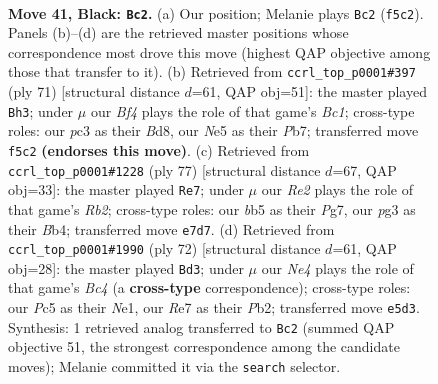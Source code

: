 \documentclass[11pt]{article}
\begin{document}
\clearpage

\begin{figure}[p]\centering
\begin{subfigure}{0.46\textwidth}\centering
\resizebox{\linewidth}{!}{%
\newchessgame
\chessboard[
  setfen={1r6/4r1k1/1p6/pBp1nb2/P5p1/1NP3P1/K6P/4R1NR b - - 4 41},
  showmover=false,
  pgfstyle=straightmove, color=movearrow, markmove={f5-c2}
]}
\caption{}
\end{subfigure}\hfill
\begin{subfigure}{0.46\textwidth}\centering
\resizebox{\linewidth}{!}{%
\newchessgame
\chessboard[
  setfen={2bb4/1p6/r2p2pk/nN1Bp3/P1p1Pp2/5P2/2R4P/1R5K b - - 3 36},
  showmover=false,
  pgfstyle=straightmove, color=movearrow, markmove={c8-h3}
]}
\caption{}
\end{subfigure}
\\[4pt]
\begin{subfigure}{0.46\textwidth}\centering
\resizebox{\linewidth}{!}{%
\newchessgame
\chessboard[
  setfen={2R5/1r3ppk/2n4p/7P/1b2p1P1/2r1B1K1/3N1P2/3R4 b - - 1 39},
  showmover=false,
  pgfstyle=straightmove, color=movearrow, markmove={b7-e7}
]}
\caption{}
\end{subfigure}\hfill
\begin{subfigure}{0.46\textwidth}\centering
\resizebox{\linewidth}{!}{%
\newchessgame
\chessboard[
  setfen={1r3k2/5pp1/2r2n1p/5b2/p1Bp3P/5PP1/1PR1P3/R3N1K1 w - - 5 37},
  showmover=false,
  pgfstyle=straightmove, color=movearrow, markmove={c4-d3}
]}
\caption{}
\end{subfigure}
\caption{\textbf{Move 41, Black: \texttt{Bc2}.} (a) Our position; Melanie plays \texttt{Bc2} (\texttt{f5c2}). Panels (b)--(d) are the retrieved master positions whose correspondence most drove this move (highest QAP objective among those that transfer to it). (b) Retrieved from \texttt{ccrl\_top\_p0001\#397} (ply 71) [structural distance $d$=61, QAP obj=51]: the master played \texttt{Bh3}; under $\mu$ our \emph{Bf4} plays the role of that game's \emph{Bc1}; cross-type roles: our \emph{p}c3 as their \emph{B}d8, our \emph{N}e5 as their \emph{P}b7; transferred move \texttt{f5c2} \textbf{(endorses this move)}. (c) Retrieved from \texttt{ccrl\_top\_p0001\#1228} (ply 77) [structural distance $d$=67, QAP obj=33]: the master played \texttt{Re7}; under $\mu$ our \emph{Re2} plays the role of that game's \emph{Rb2}; cross-type roles: our \emph{b}b5 as their \emph{P}g7, our \emph{p}g3 as their \emph{B}b4; transferred move \texttt{e7d7}. (d) Retrieved from \texttt{ccrl\_top\_p0001\#1990} (ply 72) [structural distance $d$=61, QAP obj=28]: the master played \texttt{Bd3}; under $\mu$ our \emph{Ne4} plays the role of that game's \emph{Bc4} (a \textbf{cross-type} correspondence); cross-type roles: our \emph{P}c5 as their \emph{N}e1, our \emph{R}e7 as their \emph{P}b2; transferred move \texttt{e5d3}. Synthesis: 1 retrieved analog transferred to \texttt{Bc2} (summed QAP objective 51, the strongest correspondence among the candidate moves); Melanie committed it via the \texttt{search} selector.}
\label{fig:thought-m81}
\end{figure}
\end{document}
